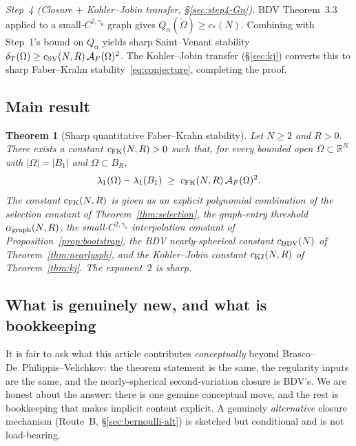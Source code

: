\documentclass[11pt]{amsart}
\newtheorem{theorem}{Theorem}[section]
\theoremstyle{definition}
\newcommand{\R}{\mathbb R}
\newcommand{\dT}{\delta_T}
\newcommand{\AF}{\mathcal A_F}
\begin{document}
\smallskip
\noindent\emph{Step~4 (Closure $+$ Kohler--Jobin transfer,
\S\ref{sec:step4-Gn}).}  BDV Theorem~3.3 applied to a small-$C^{2,
\gamma_0}$ graph gives $Q_\alpha(\widetilde\Omega)\ge c_*(N)$.
Combining with Step~1's bound on $Q_\alpha$ yields sharp Saint--Venant
stability $\dT(\Omega)\ge c_{\rm SV}(N,R)\,\AF(\Omega)^{2}$.  The
Kohler--Jobin transfer (\S\ref{sec:kj}) converts this to sharp
Faber--Krahn stability~\eqref{eq:conjecture}, completing the proof.

\subsection*{Main result}

\begin{theorem}[Sharp quantitative Faber--Krahn stability]\label{thm:main}
Let $N\ge 2$ and $R>0$.  There exists a constant
$c_{\rm FK}(N,R)>0$ such that, for every bounded open
$\Omega\subset\R^N$ with $|\Omega|=|B_1|$ and
$\Omega\subset B_R$,
\[
   \lambda_1(\Omega)-\lambda_1(B_1)
   \;\ge\;c_{\rm FK}(N,R)\,\AF(\Omega)^{2}.
\]
The constant $c_{\rm FK}(N,R)$ is given as an explicit polynomial
combination of the selection constant of Theorem~\ref{thm:selection},
the graph-entry threshold $\alpha_{\rm graph}(N,R)$, the
small-$C^{2,\gamma_0}$ interpolation constant of
Proposition~\ref{prop:bootstrap}, the BDV nearly-spherical constant
$c_{\rm BDV}(N)$ of Theorem~\ref{thm:nearlysph}, and the Kohler--Jobin
constant $c_{\rm KJ}(N,R)$ of Theorem~\ref{thm:kj}.  The exponent~$2$
is sharp.
\end{theorem}

\subsection*{What is genuinely new, and what is bookkeeping}
\label{ss:genuine-vs-bookkeeping}

It is fair to ask what this article contributes \emph{conceptually}
beyond Brasco--De~Philippis--Velichkov: the theorem statement is the
same, the regularity inputs are the same, and the
nearly-spherical second-variation closure is BDV's.  We are honest
about the answer: there is one genuine conceptual move, and the rest
is bookkeeping that makes implicit content explicit.  A
genuinely \emph{alternative} closure mechanism (Route~B,
\S\ref{sec:bernoulli-alt}) is sketched but conditional and is not
load-bearing.
\end{document}
